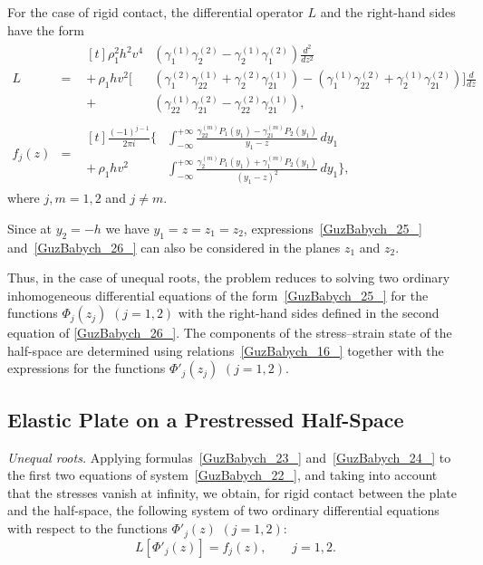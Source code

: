 For the case of rigid contact, the differential operator $L$ and the right-hand sides have the form
\begin{equation}
	\begin{array}{rcl}
	L &=&
	\begin{aligned}[t]
	 \rho_1^2 h^2 v^4
	&\left(\gamma_1^{(1)}\gamma_2^{(2)}-\gamma_2^{(1)}\gamma_1^{(2)}\right)
	\frac{d^2}{dz^2}
	\\
	+\,\rho_1 h v^2
	\Big[
	&\left(\gamma_1^{(2)}\gamma_{22}^{(1)}+\gamma_2^{(2)}\gamma_{21}^{(1)}\right)
	-
	\left(\gamma_1^{(1)}\gamma_{22}^{(2)}+\gamma_2^{(1)}\gamma_{21}^{(2)}\right)
	\Big]\frac{d}{dz}
	\\
	+
	&\left(
	\gamma_{22}^{(1)}\gamma_{21}^{(2)}-
	\gamma_{22}^{(2)}\gamma_{21}^{(1)}
	\right), 
\end{aligned}
\\
	f_j(z)&=&
	\begin{aligned}[t]
	\frac{(-1)^{j-1}}{2\pi i}
	\Bigg\{
	&\int_{-\infty}^{+\infty}
	\frac{\gamma_{22}^{(m)}P_1(y_1)-\gamma_{21}^{(m)}P_2(y_1)}{y_1-z}\,dy_1
	\\
	+\,\rho_1 h v^2
	&\int_{-\infty}^{+\infty}
	\frac{\gamma_2^{(m)}P_1(y_1)+\gamma_1^{(m)}P_2(y_1)}{(y_1-z)^2}\,dy_1
	\Bigg\},
\end{aligned}
\end{array}
\label{GuzBabych_26_}
\end{equation}
where $j,m=1,2$ and $j\neq m$.

Since at $y_2=-h$ we have $y_1=z=z_1=z_2$, expressions~\eqref{GuzBabych_25_} and~\eqref{GuzBabych_26_} can also be considered in the planes $z_1$ and $z_2$.

Thus, in the case of unequal roots, the problem reduces to solving two ordinary inhomogeneous differential equations of the form~\eqref{GuzBabych_25_} for the functions $\Phi_j(z_j)$ $(j=1,2)$ with the right-hand sides defined in the second equation of \eqref{GuzBabych_26_}. The components of the stress–strain state of the half-space are determined using relations~\eqref{GuzBabych_16_} together with the expressions for the functions $\Phi'_j(z_j)$ $(j=1,2)$.

\subsection{Elastic Plate on a Prestressed Half-Space}

\textit{Unequal roots.} Applying formulas~\eqref{GuzBabych_23_} and~\eqref{GuzBabych_24_} to the first two equations of system~\eqref{GuzBabych_22_}, and taking into account that the stresses vanish at infinity, we obtain, for rigid contact between the plate and the half-space, the following system of two ordinary differential equations with respect to the functions $\Phi'_j(z)$ $(j=1,2)$:
\begin{equation}
	\label{GuzBabych_27_}
	L[\Phi'_j(z)] = f_j(z), \qquad j=1,2 .
\end{equation}


